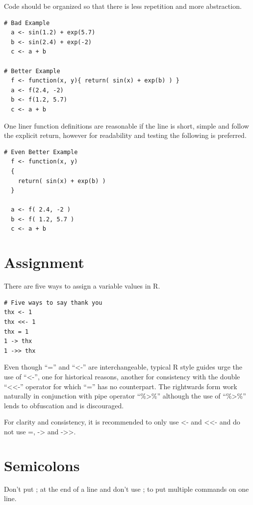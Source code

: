 \documentclass[
]{book}
\begin{document}
Code should be organized so that there is less repetition and more abstraction.

\begin{verbatim}
# Bad Example
  a <- sin(1.2) + exp(5.7)
  b <- sin(2.4) + exp(-2)
  c <- a + b

# Better Example
  f <- function(x, y){ return( sin(x) + exp(b) ) }
  a <- f(2.4, -2)
  b <- f(1.2, 5.7)
  c <- a + b
\end{verbatim}

One liner function definitions are reasonable if the line is short, simple and follow the explicit return, however for readability and testing the following is preferred.

\begin{verbatim}
# Even Better Example
  f <- function(x, y)
  {
    return( sin(x) + exp(b) )
  }
  
  a <- f( 2.4, -2 )
  b <- f( 1.2, 5.7 )
  c <- a + b
\end{verbatim}

\hypertarget{assignment}{%
\section{Assignment}\label{assignment}}

There are five ways to assign a variable values in R.

\begin{verbatim}
# Five ways to say thank you
thx <- 1
thx <<- 1
thx = 1
1 -> thx
1 ->> thx
\end{verbatim}

Even though ``='' and ``\textless-'' are interchangeable, typical R style guides
urge the use of ``\textless-'', one for historical reasons, another for
consistency with the double ``\textless\textless-'' operator for which ``='' has no
counterpart. The rightwards form work naturally in conjunction with
pipe operator ``\%\textgreater\%'' although the use of ``\%\textgreater\%'' lends to obfuscation and
is discouraged.

For clarity and consistency, it is recommended to only use \textless- and \textless\textless- and do not use =, -\textgreater{} and -\textgreater\textgreater.

\hypertarget{semicolons}{%
\section{Semicolons}\label{semicolons}}

Don't put ; at the end of a line and don't use ; to put multiple commands on one line.
\end{document}

